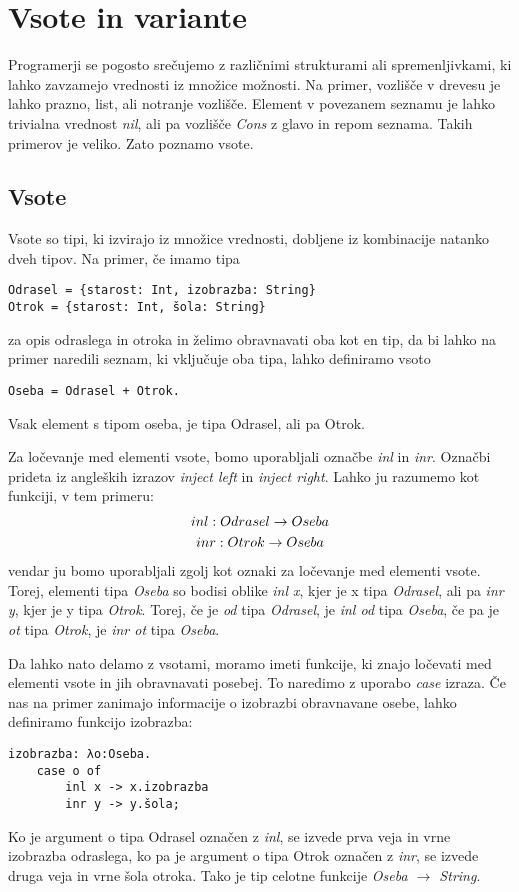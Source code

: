 \documentclass[12pt,a4paper,openany]{book}
\begin{document}
\chapter{Vsote in variante}
Programerji se pogosto srečujemo z različnimi strukturami ali spremenljivkami, ki lahko zavzamejo vrednosti iz množice možnosti. Na primer, vozlišče v drevesu je lahko prazno, list, ali 
notranje vozlišče. Element v povezanem seznamu je lahko trivialna vrednost \emph{nil}, ali pa vozlišče \emph{Cons} z glavo in repom seznama. Takih primerov je veliko. Zato poznamo \textbf{}{vsote}.

\section{Vsote}
Vsote so tipi, ki izvirajo iz množice vrednosti, dobljene iz kombinacije natanko dveh tipov. Na primer, če imamo tipa
\begin{lstlisting}
Odrasel = {starost: Int, izobrazba: String}
Otrok = {starost: Int, šola: String}
\end{lstlisting}
za opis odraslega in otroka in želimo obravnavati oba kot en tip, da bi lahko na primer naredili seznam, ki vključuje oba tipa, lahko definiramo vsoto
\begin{lstlisting}
Oseba = Odrasel + Otrok.
\end{lstlisting}
Vsak element s tipom oseba, je tipa Odrasel, ali pa Otrok.

Za ločevanje med elementi vsote, bomo uporabljali označbe \emph{inl} in \emph{inr}. Označbi prideta iz angleških izrazov \textit{inject left} in \textit{inject right}. Lahko ju razumemo kot
funkciji, v tem primeru:
\begin{gather}
    inl: Odrasel \rightarrow Oseba \notag\\
    inr: Otrok \rightarrow Oseba \notag
\end{gather}
vendar ju bomo uporabljali zgolj kot oznaki za ločevanje med elementi vsote. Torej, elementi tipa \emph{Oseba} so bodisi oblike \emph{inl x}, kjer je x tipa \emph{Odrasel}, ali pa \emph{inr y}, kjer je y 
tipa \emph{Otrok}. Torej, če je \emph{od} tipa \emph{Odrasel}, je \emph{inl od} tipa \emph{Oseba}, če pa je \emph{ot} tipa \emph{Otrok}, je \emph{inr ot} tipa \emph{Oseba}.

Da lahko nato delamo z vsotami, moramo imeti funkcije, ki znajo ločevati med elementi vsote in jih obravnavati posebej. To naredimo z uporabo \emph{case} izraza. Če nas na primer zanimajo 
informacije o izobrazbi obravnavane osebe, lahko definiramo funkcijo izobrazba:
\begin{lstlisting}
izobrazba: λo:Oseba.
    case o of
        inl x -> x.izobrazba
        inr y -> y.šola;
\end{lstlisting}
Ko je argument o tipa Odrasel označen z \emph{inl}, se izvede prva veja in vrne izobrazba odraslega, ko pa je argument o tipa Otrok označen z \emph{inr}, se izvede druga veja in vrne šola
otroka. Tako je tip celotne funkcije \emph{Oseba $\rightarrow$ String}.
\end{document}
